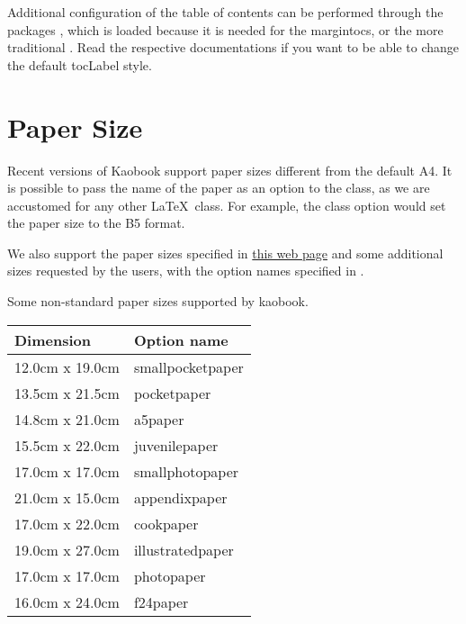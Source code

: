 Additional configuration of the table of contents can be performed 
through the packages , which is loaded because it is 
needed for the margintocs, or the more traditional . 
Read the respective documentations if you want to be able to change the 
default \acrshort{tocLabel} style.

\section{Paper Size}

Recent versions of Kaobook support paper sizes different from the
default A4. It is possible to pass the name of the paper as an option
to the class, as we are accustomed for any other \LaTeX\ class. For
example, the class option  would set the paper size
to the B5 format.

We also support the paper sizes specified in
\href{https://www.bod.de/hilfe/hilfe-und-service.html?cmd=SINGLE\&entryID=2494\_GER\_WSS\&eo=2\&title=welche-buchformate-gibt-es}{this
web page} and some additional sizes requested by the users, with the 
option names specified in .

\begin{margintable}[*-6]
	\caption{Some non-standard paper sizes supported by kaobook.}
	\begin{tabular}{ll}
		\toprule
		Dimension & Option name \\
		\midrule
		12.0cm x 19.0cm & smallpocketpaper \\
		13.5cm x 21.5cm & pocketpaper \\
		14.8cm x 21.0cm & a5paper \\
		15.5cm x 22.0cm & juvenilepaper \\
		17.0cm x 17.0cm & smallphotopaper \\
		21.0cm x 15.0cm & appendixpaper \\
		17.0cm x 22.0cm & cookpaper \\
		19.0cm x 27.0cm & illustratedpaper \\
		17.0cm x 17.0cm & photopaper \\
		16.0cm x 24.0cm & f24paper \\
		\bottomrule
	\end{tabular}
\end{margintable}

